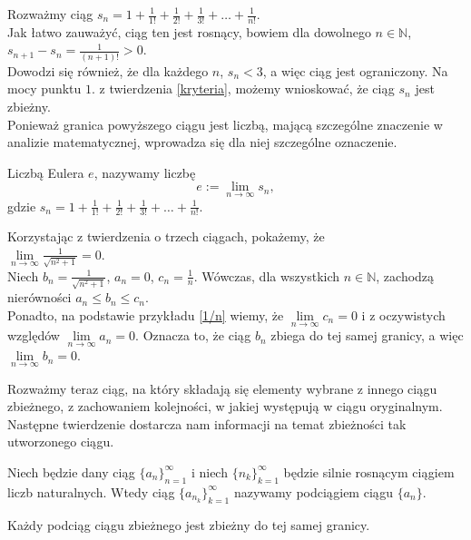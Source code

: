 \begin{przyklad}
Rozważmy ciąg $s_n=1+\frac{1}{1!}+\frac{1}{2!}+\frac{1}{3!}+\dots+\frac{1}{n!}$.\\
Jak łatwo zauważyć, ciąg ten jest rosnący, bowiem dla dowolnego $n \in \mathbb{N}$, $s_{n+1}-s_n=\frac{1}{(n+1)!}>0$.\\
Dowodzi się również, że dla każdego $n$, $s_n<3$, a więc ciąg jest ograniczony. Na mocy punktu $1.$ z twierdzenia 
\ref{kryteria}, możemy wnioskować, że ciąg $s_n$ jest zbieżny.\\
Ponieważ granica powyższego ciągu jest liczbą, mającą szczególne znaczenie w analizie matematycznej, wprowadza się dla niej szczególne oznaczenie.
\begin{definicja}
Liczbą Eulera $e$, nazywamy liczbę 
\begin{displaymath}
e:=\lim_{n \to \infty} s_n, 
\end{displaymath}
gdzie $s_n=1+\frac{1}{1!}+\frac{1}{2!}+\frac{1}{3!}+\dots+\frac{1}{n!}$.
\end{definicja}
\end{przyklad}
\begin{przyklad}
Korzystając z twierdzenia o trzech ciągach, pokażemy, że \\
$\lim\limits_{n \to \infty}\frac{1}{\sqrt{n^2+1}}=0$.\\
Niech $b_n=\frac{1}{\sqrt{n^2+1}}$, $a_n=0$, $c_n=\frac{1}{n}$. Wówczas, dla wszystkich $n \in \mathbb{N}$, zachodzą nierówności $a_n \leq b_n \leq c_n$.\\
Ponadto, na podstawie przykładu \ref{1/n} wiemy, że $\lim\limits_{n \to \infty}c_n=0$ i z oczywistych względów $\lim\limits_{n \to \infty}a_n=0$. Oznacza to, że ciąg $b_n$ zbiega do tej samej granicy, a więc $\lim\limits_{n \to \infty}b_n=0$. 
\end{przyklad}
Rozważmy teraz ciąg, na który składają się elementy wybrane z innego ciągu zbieżnego, z zachowaniem kolejności, w jakiej występują w ciągu oryginalnym. Następne twierdzenie dostarcza nam informacji na temat zbieżności tak utworzonego ciągu. 
\begin{definicja}
Niech będzie dany ciąg $\{a_n\}_{n=1}^{\infty}$ i niech $\{n_k\}_{k=1}^{\infty}$ będzie silnie rosnącym ciągiem liczb naturalnych. Wtedy ciąg $\{a_{n_k}\}_{k=1}^{\infty}$ nazywamy podciągiem ciągu $\{a_n\}$.
\end{definicja}
\begin{twierdzenie}
Każdy podciąg ciągu zbieżnego jest zbieżny do tej samej granicy.
\end{twierdzenie}
